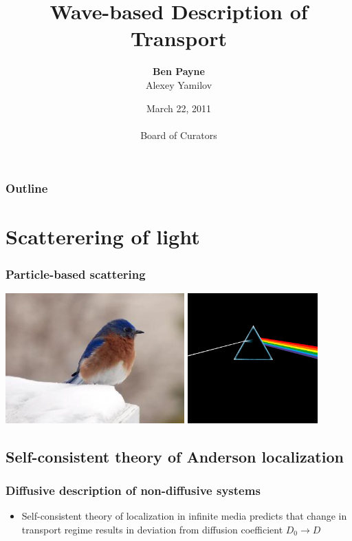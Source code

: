 \documentclass[xcolor=dvipsnames]{beamer}
\title[Wave-based Transport]{Wave-based Description of Transport}
\author[Ben Payne]{\textbf{Ben Payne}\\ Alexey Yamilov}
\institute[MS\&T]{Missouri University of Science and Technology}
\date[Board of Curators \ 20110222]{March 22, 2011\\ \ \\Board of Curators}
\begin{document}
\begin{frame} 
\titlepage
\end{frame}

\begin{frame}
 \frametitle{Outline}
 \tableofcontents
\end{frame}

\section{Scatterering of light}

\begin{frame}
 \frametitle{Particle-based scattering}
\begin{center}
\includegraphics[height=5cm]{pictures/eastern_bluebird_snow}
\includegraphics[height=5cm]{pictures/Dark_Side_of_the_Moon}
\end{center}
\end{frame}

\subsection{Self-consistent theory of Anderson localization}
\begin{frame}
 \frametitle{Diffusive description of non-diffusive systems}
\begin{itemize}
\item Self-consistent theory of localization in infinite media predicts that change in transport regime results in deviation from diffusion coefficient $D_0 \rightarrow D$
\end{itemize}
 \end{frame}
\end{document}
